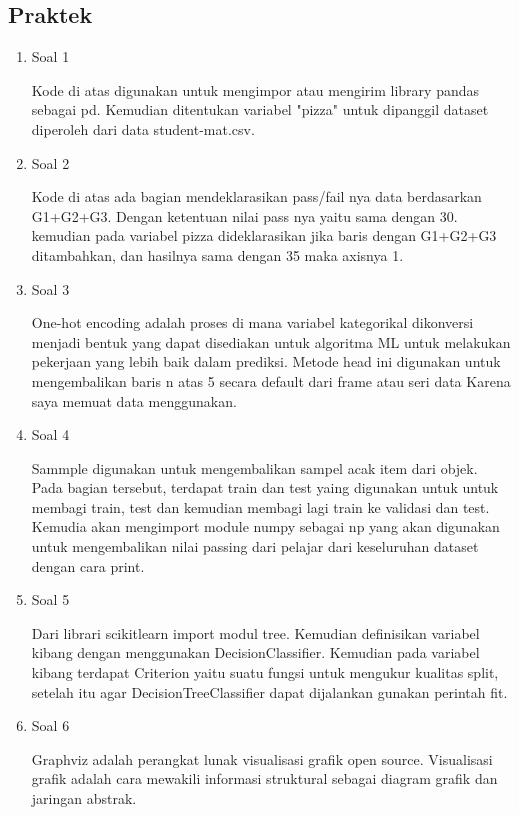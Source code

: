 \subsection{Praktek}
\begin{enumerate}
	\item Soal 1
	\hfill\break
	
	Kode di atas digunakan untuk mengimpor atau mengirim library pandas sebagai pd. Kemudian ditentukan variabel "pizza" untuk dipanggil dataset diperoleh dari data student-mat.csv. 
	
	\item Soal 2
	\hfill\break
	
	Kode di atas ada bagian mendeklarasikan pass/fail nya data berdasarkan G1+G2+G3. Dengan ketentuan nilai pass nya yaitu sama dengan 30. kemudian pada variabel pizza dideklarasikan jika baris dengan G1+G2+G3 ditambahkan, dan hasilnya sama dengan 35 maka axisnya 1.
	
	\item Soal 3
	\hfill\break
	
	One-hot encoding adalah proses di mana variabel kategorikal dikonversi menjadi bentuk yang dapat disediakan untuk algoritma ML untuk melakukan pekerjaan yang lebih baik dalam prediksi. Metode head ini digunakan untuk mengembalikan baris n atas 5 secara default dari frame atau seri data Karena saya memuat data menggunakan. 

	\item Soal 4
	\hfill\break
	
	Sammple digunakan untuk mengembalikan sampel acak item dari objek. Pada bagian tersebut, terdapat train dan test yaing digunakan untuk untuk membagi train, test dan kemudian membagi lagi train ke validasi dan test. Kemudia akan mengimport module numpy sebagai np yang akan digunakan untuk mengembalikan nilai passing dari pelajar dari keseluruhan dataset dengan cara print.

	\item Soal 5
	\hfill\break
	
	Dari librari scikitlearn import modul tree. Kemudian definisikan variabel kibang dengan menggunakan DecisionClassifier. Kemudian pada variabel kibang terdapat Criterion yaitu suatu fungsi untuk mengukur kualitas split, setelah itu agar DecisionTreeClassifier dapat dijalankan gunakan perintah fit.

	\item Soal 6
	\hfill\break
	
	Graphviz adalah perangkat lunak visualisasi grafik open source. Visualisasi grafik adalah cara mewakili informasi struktural sebagai diagram grafik dan jaringan abstrak.


\end{enumerate}
